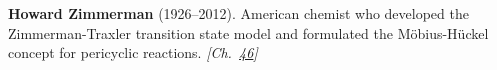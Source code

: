 \textbf{Howard Zimmerman} (1926–2012). American chemist who developed the Zimmerman-Traxler transition state model and formulated the M\"{o}bius-H\"{u}ckel concept for pericyclic reactions. \emph{[Ch.~\hyperref[ch:woodwardhoffmannrules]{46}]}


